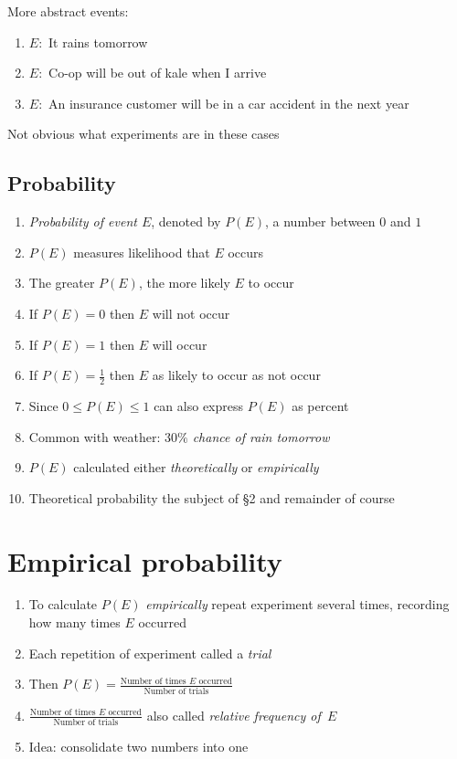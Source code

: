 \documentclass{ximera}
\begin{document}
\begin{example}
More abstract events:
\begin{enumerate}
\item $E:$ It rains tomorrow
\item $E:$ Co-op will be out of kale when I arrive
\item $E:$ An insurance customer will be in a car accident in the next year
\end{enumerate}
Not obvious what experiments are in these cases
\end{example}

\subsection{Probability}
\begin{enumerate}
\item {\em Probability of event $E$}, denoted by $P\left(E\right)$,
a number between $0$ and $1$
\item $P\left(E\right)$ measures likelihood that $E$ occurs
\item The greater $P\left(E\right)$, the more likely $E$ to occur
\item If $P\left(E\right)=0$ then $E$ will not occur
\item If $P\left(E\right)=1$ then $E$ will occur
\item If $P\left(E\right)=\frac{1}{2}$ then $E$ 
as likely to occur as not occur
\item Since $0\le P\left(E\right)\le 1$ can also express
$P\left(E\right)$ as percent
\item Common with weather: {\em $30\%$ chance of rain tomorrow}
\item $P\left(E\right)$ calculated either {\em theoretically}
or {\em empirically}
\item Theoretical probability the subject of \S2 and remainder of course
\end{enumerate}

\section{Empirical probability}
\begin{enumerate}
\item To calculate $P\left(E\right)$ {\em empirically}
repeat experiment several times, recording how
many times $E$ occurred
\item Each repetition of experiment called a {\em trial}
\item Then $P\left(E\right)=
\frac{\text{Number of times $E$ occurred}}
{\text{Number of trials}}$
\item $\frac{\text{Number of times $E$ occurred}}
{\text{Number of trials}}$ also called
{\em relative frequency of~$E$}
\item Idea: consolidate two numbers into one
\end{enumerate}
\end{document}
